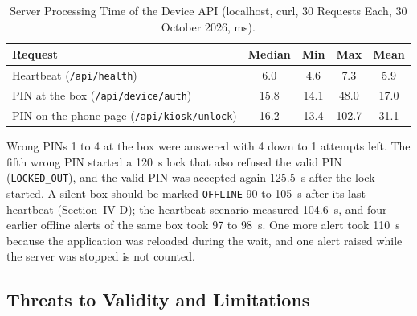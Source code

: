 \documentclass[journal,onecolumn]{IEEEtran}
\begin{document}
\begin{table}[!htbp]
\renewcommand{\arraystretch}{1.02}
\centering
\small
\caption{Server Processing Time of the Device API (localhost, curl, 30 Requests Each, 30 October 2026, ms).}
\label{tab:latency}
\vspace{5pt}
\begin{tabular}{l c c c c}
\hline
Request & Median & Min & Max & Mean \\
\hline
\rule{0pt}{2.6ex}Heartbeat (\texttt{/api/health})                     & 6.0  & 4.6  & 7.3   & 5.9 \\
PIN at the box (\texttt{/api/device/auth})           & 15.8 & 14.1 & 48.0  & 17.0 \\
PIN on the phone page (\texttt{/api/kiosk/unlock})   & 16.2 & 13.4 & 102.7 & 31.1 \\
\hline
\end{tabular}
\end{table}

Wrong PINs 1 to 4 at the box were answered with 4 down to 1 attempts left. The fifth wrong PIN started a 120~s lock
that also refused the valid PIN (\texttt{LOCKED\_OUT}), and the valid PIN was accepted again 125.5~s after the lock
started. A silent box should be marked \texttt{OFFLINE} 90 to 105~s after its last heartbeat (Section~IV-D); the
heartbeat scenario measured 104.6~s, and four earlier offline alerts of the
same box took 97 to 98~s. One more alert took 110~s because the application was reloaded during the wait, and one alert
raised while the server was stopped is not counted.

\subsection{Threats to Validity and Limitations}
\label{sec:limits}
\end{document}
